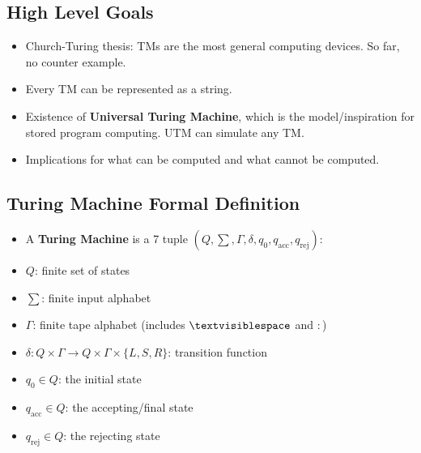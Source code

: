 \subsection{High Level Goals}
\begin{itemize}
    \item Church-Turing thesis: TMs are the most general computing devices. So far, no counter example.
    \item Every TM can be represented as a string.
    \item Existence of \textbf{Universal Turing Machine}, which is the model/inspiration for stored program computing. UTM can simulate any TM.
    \item Implications for what can be computed and what cannot be computed.
\end{itemize}

\subsection{Turing Machine Formal Definition}
\begin{itemize}
    \item A \textbf{Turing Machine} is a 7 tuple $(Q, \sum, \Gamma, \delta, q_0, q_{\text{acc}}, q_{\text{rej}})$:
    \item $Q$: finite set of states
    \item $\sum$: finite input alphabet
    \item $\Gamma$: finite tape alphabet (includes $\textvisiblespace$ and $:$)
    \item $\delta: Q \times \Gamma \rightarrow Q \times \Gamma \times \{ L, S, R \}$: transition function
    \item $q_0 \in Q$: the initial state
    \item $q_{\text{acc}} \in Q$: the accepting/final state
    \item $q_{\text{rej}} \in Q$: the rejecting state
\end{itemize}

